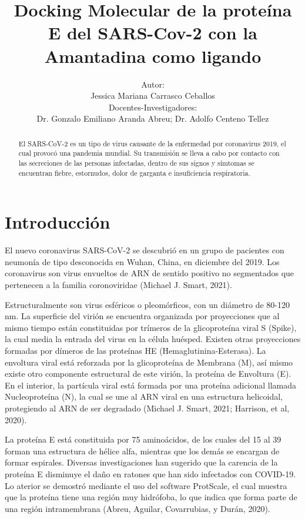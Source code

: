\documentclass[12pt]{article}
\title{Docking Molecular de la proteína E del SARS-Cov-2 con la Amantadina como ligando}
\author{Autor:\\
        Jessica Mariana Carrasco Ceballos\inst{1}\\ 
        Docentes-Investigadores:\\
        Dr. Gonzalo Emiliano Aranda Abreu\inst{1}; Dr. Adolfo Centeno Tellez\inst{1}}
\begin{document}
 
	
	\maketitle
	\begin{abstract}
	     El SARS-CoV-2 es un tipo de virus causante de la enfermedad por coronavirus 2019, el cual provocó una pandemia mundial. Su transmisión se lleva a cabo por contacto con las secreciones de las personas infectadas, dentro de sus signos y símtomas se encuentran fiebre, estornudos, dolor de garganta e insuficiencia respiratoria.
	\end{abstract}
	
	\section{Introducción}
	\label{sec:introducao}
	
		El nuevo coronavirus SARS-CoV-2 se descubrió en un grupo de pacientes con neumonía de tipo desconocida en Wuhan, China, en diciembre del 2019. Los coronavirus son virus envueltos de ARN de sentido positivo no segmentados que pertenecen a la familia coronoviridae (Michael J. Smart, 2021).
	
	Estructuralmente son virus esféricos o pleomórficos, con un diámetro de 80-120 nm. La superficie del virión se encuentra organizada por proyecciones que al mismo tiempo están constituidas por trímeros de la glicoproteína viral S (Spike), la cual media la entrada del virus en la célula huésped.
	Existen otras proyecciones formadas por dímeros de las proteínas HE (Hemaglutinina-Esterasa). La envoltura viral está reforzada por la glicoproteína de Membrana (M), así mismo existe otro componente estructural de este virión, la proteína de Envoltura (E). En el interior, la partícula viral está formada por una proteína adicional llamada Nucleoproteína (N), la cual se une al ARN viral en una estructura helicoidal, protegiendo al ARN de ser degradado (Michael J. Smart, 2021; Harrison, et al, 2020). 
	
	La proteína E está constituida por 75 aminoácidos, de los cuales del 15 al 39 forman una estructura de hélice alfa, mientras que los demás se encargan de formar espirales. Diversas investigaciones han sugerido que la carencia de la proteína E disminuye el daño en ratones que han sido infectados con COVID-19. Lo aterior se demostró mediante el uso del software ProtScale, el cual muestra que la proteína tiene una región muy hidrófoba, lo que indica que forma parte de una región intramembrana (Abreu, Aguilar, Covarrubias, y Durán, 2020).
	
\end{document}

